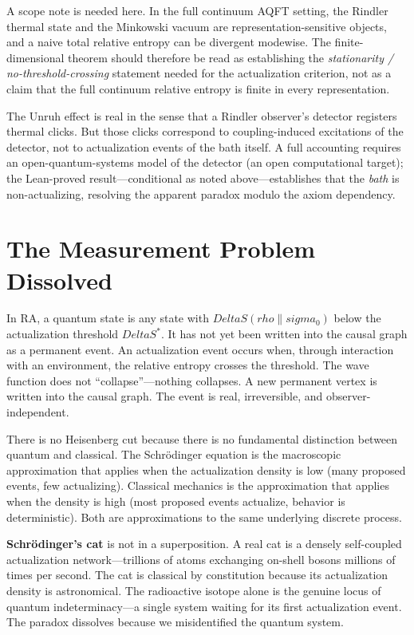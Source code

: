 \documentclass[11pt]{article}
\def\Delta{Delta}%
\def\rho{rho}%
\def\sigma{sigma}%
\begin{document}
A scope note is needed here. In the full continuum AQFT setting, the Rindler thermal state and the Minkowski vacuum are representation-sensitive objects, and a naive total relative entropy can be divergent modewise. The finite-dimensional theorem should therefore be read as establishing the \emph{stationarity / no-threshold-crossing} statement needed for the actualization criterion, not as a claim that the full continuum relative entropy is finite in every representation.

The Unruh effect is real in the sense that a Rindler observer's detector registers thermal clicks. But those clicks correspond to coupling-induced excitations of the detector, not to actualization events of the bath itself. A full accounting requires an open-quantum-systems model of the detector (an open computational target); the Lean-proved result---conditional as noted above---establishes that the \emph{bath} is non-actualizing, resolving the apparent paradox modulo the axiom dependency.

\section{The Measurement Problem Dissolved}
\label{sec:measurement}

In RA, a quantum state is any state with $\Delta S(\rho\|\sigma_0)$ below the actualization threshold $\Delta S^*$. It has not yet been written into the causal graph as a permanent event. An actualization event occurs when, through interaction with an environment, the relative entropy crosses the threshold. The wave function does not ``collapse''---nothing collapses. A new permanent vertex is written into the causal graph. The event is real, irreversible, and observer-independent.

There is no Heisenberg cut because there is no fundamental distinction between quantum and classical. The Schr\"odinger equation is the macroscopic approximation that applies when the actualization density is low (many proposed events, few actualizing). Classical mechanics is the approximation that applies when the density is high (most proposed events actualize, behavior is deterministic). Both are approximations to the same underlying discrete process.

\textbf{Schr\"odinger's cat} is not in a superposition. A real cat is a densely self-coupled actualization network---trillions of atoms exchanging on-shell bosons millions of times per second. The cat is classical by constitution because its actualization density is astronomical. The radioactive isotope alone is the genuine locus of quantum indeterminacy---a single system waiting for its first actualization event. The paradox dissolves because we misidentified the quantum system.
\end{document}
